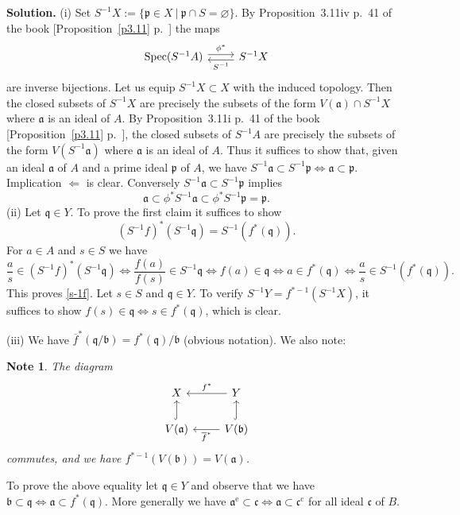 \documentclass[12pt,letterpaper]{article}%
\newcommand{\oo}{\operatorname}\newcommand{\ooo}{\operatorname*}
\newcommand{\mf}{\mathfrak}
\newcommand{\aaa}{\mf a}
\newcommand{\bbb}{\mf b}
\newcommand{\ccc}{\mf c}
\newcommand{\ppp}{\mf p}
\newcommand{\qqq}{\mf q}
\newcommand{\ov}{\overline}
\newcommand{\Spec}{\operatorname{Spec}}\newcommand{\Sp}{\operatorname{Spec}}
\newcommand{\nn}{\noindent}
\newtheorem{note}[thm]{Note}
\begin{document}
\nn\textbf{Solution.} (i) Set $S^{-1}X:=\{\ppp\in X\ |\ \ppp\cap S=\varnothing\}$. By Proposition~3.11iv p.~41 of the book [Proposition~\ref{p3.11} p.~\pageref{p3.11}] the maps %
\[\begin{tikzcd}
	{\Spec(S^{-1}A)} & {S^{-1}X}
	\arrow["{\phi^*}", shift left=1, from=1-1, to=1-2]
	\arrow["{S^{-1}}", shift left=1, from=1-2, to=1-1]
\end{tikzcd}\]
are inverse bijections. Let us equip $S^{-1}X\subset X$ with the induced topology. Then the closed subsets of $S^{-1}X$ are precisely the subsets of the form $V(\aaa)\cap S^{-1}X$ where $\aaa$ is an ideal of $A$. By Proposition~3.11i p.~41 of the book [Proposition~\ref{p3.11} p.~\pageref{p3.11}], the closed subsets of $S^{-1}A$ are precisely the subsets of the form $V(S^{-1}\aaa)$ where $\aaa$ is an ideal of $A$. Thus it suffices to show that, given an ideal $\aaa$ of $A$ and a prime ideal $\ppp$ of $A$, we have $S^{-1}\aaa\subset S^{-1}\ppp\iff\aaa\subset\ppp$. Implication $\Leftarrow$ is clear. Conversely $S^{-1}\aaa\subset S^{-1}\ppp$ implies 
$$
\aaa\subset\phi^*S^{-1}\aaa\subset\phi^*S^{-1}\ppp=\ppp.
$$ 
(ii) Let $\qqq\in Y$. To prove the first claim it suffices to show 
\begin{equation}\label{s-1f}
(S^{-1}f)^*(S^{-1}\qqq)=S^{-1}(f^*(\qqq)).
\end{equation}
For $a\in A$ and $s\in S$ we have 
$$
\frac as\in(S^{-1}f)^*(S^{-1}\qqq)\iff\frac{f(a)}{f(s)}\in S^{-1}\qqq\iff f(a)\in\qqq\iff a\in f^*(\qqq)\iff\frac as\in S^{-1}(f^*(\qqq)).
$$ 
This proves \eqref{s-1f}. Let $s\in S$ and $\qqq\in Y$. To verify $S^{-1}Y=f^{*-1}(S^{-1}X)$, it suffices to show $f(s)\in\qqq\iff s\in f^*(\qqq)$, which is clear.

\nn(iii) We have $\ov f^*(\qqq/\bbb)=f^*(\qqq)/\bbb$ (obvious notation). We also note:
\begin{note}\label{vavb}
The diagram %
\[\begin{tikzcd}
	X & Y \\
	{V(\mathfrak a)} & {V(\mathfrak b)}
	\arrow["{f^*}"', from=1-2, to=1-1]
	\arrow["{\overline f^*}", from=2-2, to=2-1]
	\arrow[hook, from=2-2, to=1-2]
	\arrow[hook, from=2-1, to=1-1]
\end{tikzcd}\]
commutes, and we have $f^{*-1}(V(\bbb))=V(\aaa)$.
\end{note}
To prove the above equality let $\qqq\in Y$ and observe that we have $\bbb\subset\qqq\iff\aaa\subset f^*(\qqq)$. More generally we have $\aaa^{\oo e}\subset\ccc\iff\aaa\subset\ccc^{\oo c}$ for all ideal $\ccc$ of $B$.
\end{document}
